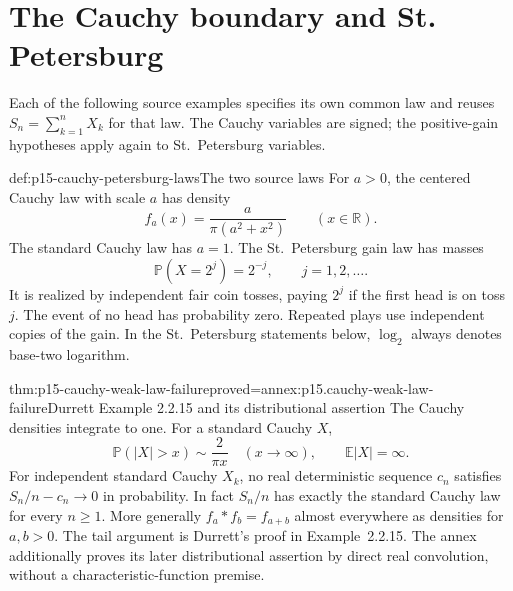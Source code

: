 \section{The Cauchy boundary and St. Petersburg}
\label{sec:p15-cauchy-and-petersburg}

Each of the following source examples specifies its own common law
and reuses \(S_n=\sum_{k=1}^nX_k\) for that law. The Cauchy variables
are signed; the positive-gain hypotheses apply again to
St.~Petersburg variables.

\begin{hbdefinition}{def:p15-cauchy-petersburg-laws}{The two source laws}
For \(a>0\), the centered Cauchy law with scale \(a\) has density
\[
 f_a(x)=\frac{a}{\pi(a^2+x^2)}\qquad(x\in\mathbb R).
\]
The standard Cauchy law has \(a=1\).
The St.~Petersburg gain law has masses
\[
 \mathbb P(X=2^j)=2^{-j},\qquad j=1,2,\ldots.
\]
It is realized by independent fair coin tosses, paying \(2^j\) if the
first head is on toss \(j\). The event of no head has probability zero.
Repeated plays use independent copies of the gain.
In the St.~Petersburg statements below, \(\log_2\) always denotes
base-two logarithm.
\end{hbdefinition}

\begin{hbtheorem}{thm:p15-cauchy-weak-law-failure}{proved=annex:p15.cauchy-weak-law-failure}{Durrett Example 2.2.15 and its distributional assertion}
The Cauchy densities integrate to one. For a standard Cauchy \(X\),
\[
 \mathbb P(|X|>x)\sim\frac{2}{\pi x}\quad(x\to\infty),
 \qquad \mathbb E|X|=\infty.
\]
For independent standard Cauchy \(X_k\), no real deterministic
sequence \(c_n\) satisfies \(S_n/n-c_n\to0\) in probability.
In fact \(S_n/n\) has exactly the standard Cauchy law for every
\(n\geq1\). More generally \(f_a*f_b=f_{a+b}\) almost everywhere
as densities for \(a,b>0\).
The tail argument is Durrett's proof in Example~2.2.15.
The annex additionally proves its later distributional assertion by
direct real convolution, without a characteristic-function premise.
\end{hbtheorem}

